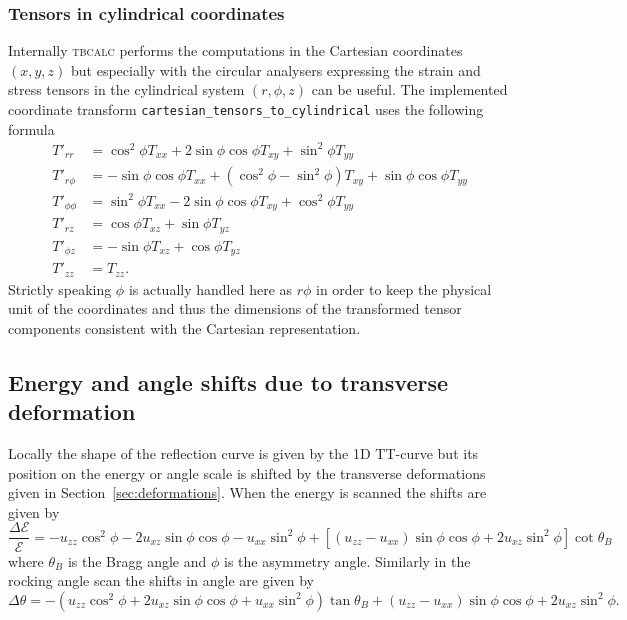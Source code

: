 \documentclass[11pt,a4paper]{article}
\begin{document}
\subsubsection{Tensors in cylindrical coordinates}
Internally \textsc{tbcalc} performs the computations in the Cartesian coordinates $(x,y,z)$ but especially with the circular analysers expressing the strain and stress tensors in the cylindrical system $(r,\phi,z)$ can be useful. The implemented coordinate transform \texttt{cartesian\_tensors\_to\_cylindrical} uses the following formula
\begin{align}
T'_{rr} &=   \cos^2 \phi T_{xx}  + 2 \sin \phi \cos \phi  T_{xy} +  \sin^2 \phi T_{yy} \\
T'_{r \phi} &=  -  \sin \phi \cos \phi T_{xx} + (\cos^2 \phi - \sin^2 \phi) T_{xy} + \sin \phi \cos \phi T_{yy} \\
T'_{\phi \phi} &= \sin^2 \phi T_{xx} - 2 \sin \phi \cos \phi  T_{xy} + \cos^2 \phi T_{yy} \\
T'_{r z} &= \cos \phi T_{xz} + \sin \phi T_{yz} \\
T'_{\phi z} &= - \sin \phi T_{xz} + \cos \phi T_{yz} \\
T'_{z z} &= T_{zz}. 
\end{align}
Strictly speaking $\phi$ is actually handled here as $r \phi$ in order to keep the physical unit of the coordinates and thus the dimensions of the transformed tensor components consistent with the Cartesian representation.

\subsection{Energy and angle shifts due to transverse deformation}
Locally the shape of the reflection curve is given by the 1D TT-curve but its position on the energy or angle scale is shifted by the transverse deformations given in Section~\ref{sec:deformations}. When the energy is scanned the shifts are given by
\begin{equation}
\frac{\Delta \mathcal{E}}{\mathcal{E}} = 
- u_{zz} \cos^2 \phi - 2 u_{xz} \sin \phi \cos \phi
- u_{xx} \sin^2 \phi 
+\left[\left(u_{zz} - u_{xx} \right) \sin \phi \cos \phi + 2 u_{x z} \sin^2 \phi \right] \cot \theta_B
\end{equation}
where $\theta_B$ is the Bragg angle and $\phi$ is the asymmetry angle. Similarly in the rocking angle scan the shifts in angle are given by
\begin{equation}
\Delta \theta = - \left( u_{zz} \cos^2 \phi + 2 u_{xz} \sin \phi \cos \phi
+ u_{xx} \sin^2 \phi \right) \tan \theta_B + \left(u_{zz} - u_{xx} \right) \sin \phi \cos \phi + 2 u_{x z} \sin^2 \phi.
\end{equation}
\end{document}
